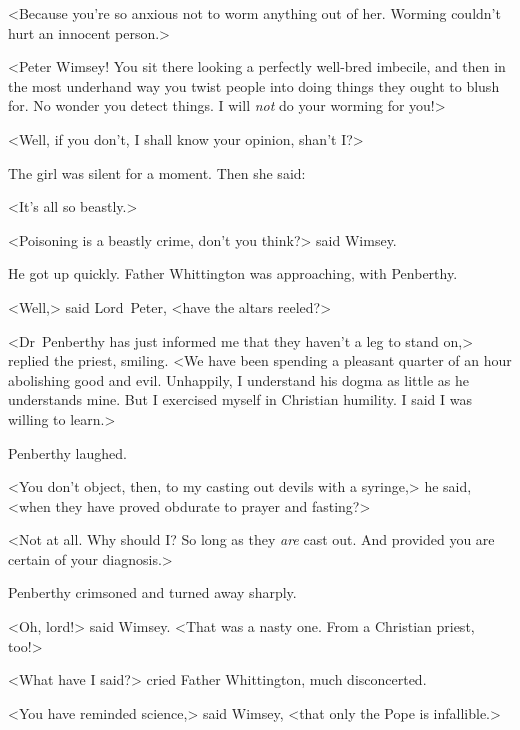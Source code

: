 <Because you're so anxious not to worm anything out of her. Worming couldn't hurt an innocent person.>

<Peter Wimsey! You sit there looking a perfectly well-bred imbecile, and then in the most underhand way you twist people into doing things they ought to blush for. No wonder you detect things. I will \emph{not} do your worming for you!>

<Well, if you don't, I shall know your opinion, shan't I\@?>

The girl was silent for a moment. Then she said:

<It's all so beastly.>

<Poisoning is a beastly crime, don't you think?> said Wimsey.

He got up quickly. Father Whittington was approaching, with Penberthy.

<Well,> said Lord~Peter, <have the altars reeled?>

<Dr~Penberthy has just informed me that they haven't a leg to stand on,> replied the priest, smiling. <We have been spending a pleasant quarter of an hour abolishing good and evil. Unhappily, I understand his dogma as little as he understands mine. But I exercised myself in Christian humility. I said I was willing to learn.>

Penberthy laughed.

<You don't object, then, to my casting out devils with a syringe,> he said, <when they have proved obdurate to prayer and fasting?>

<Not at all. Why should I\@? So long as they \emph{are} cast out. And provided you are certain of your diagnosis.>

Penberthy crimsoned and turned away sharply.

<Oh, lord!> said Wimsey. <That was a nasty one. From a Christian priest, too!>

<What have I said?> cried Father Whittington, much disconcerted.

<You have reminded science,> said Wimsey, <that only the Pope is infallible.>